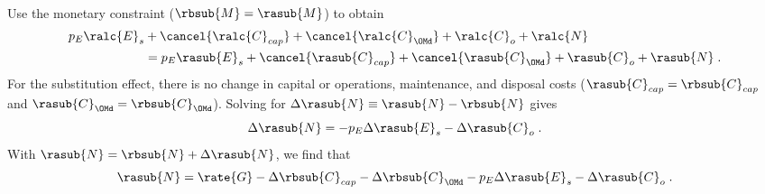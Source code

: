 \begin{landscape}
{}
{
~
  
Use the monetary constraint ($\rbsub{M} = \rasub{M}$) to obtain
%
\begin{align}
  p_E \ralc{E}_s &+ \cancel{\ralc{C}_{cap}} + \cancel{\ralc{C}_{\OMd}} + \ralc{C}_o + \ralc{N} \nonumber \\
                 &= p_E \rasub{E}_s + \cancel{\rasub{C}_{cap}} + \cancel{\rasub{C}_{\OMd}} + \rasub{C}_o + \rasub{N} \; .
\end{align}
%
For the substitution effect, there is no change in capital or operations, maintenance, and disposal costs
($\rasub{C}_{cap} = \rbsub{C}_{cap}$ and $\rasub{C}_{\OMd} = \rbsub{C}_{\OMd}$).
Solving for $\Delta \rasub{N} \equiv \rasub{N} - \rbsub{N}$ gives
%
\begin{equation}
  \Delta \rasub{N} = - p_E \Delta \rasub{E}_s - \Delta \rasub{C}_o \; .
\end{equation}
%
With $\rasub{N} = \rbsub{N} + \Delta \rasub{N}$, 
we find that
%
\begin{equation}
  \rasub{N} = \rate{G} - \Delta \rbsub{C}_{cap} - \Delta \rbsub{C}_{\OMd} - p_E \Delta \rasub{E}_s - \Delta \rasub{C}_o \; .
\end{equation}
%
}

\end{landscape}
